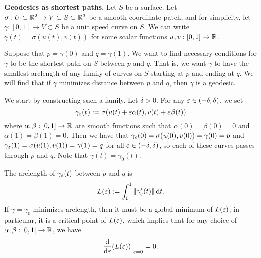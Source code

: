 {\bf Geodesics as shortest paths.} Let $S$ be a surface. 
Let $\sigma : U \subset \mathbb{R}^2 \to V \subset S \subset \mathbb{R}^3$ be a smooth 
coordinate patch, and for simplicity, let $\gamma : [0, 1] \to V \subset S$ 
be a unit speed curve on $S$. We can write $\gamma(t) = \sigma(u(t), v(t))$
for some scalar functions $u, v : [0, 1] \to \mathbb{R}$.

Suppose that $p = \gamma(0)$ and $q = \gamma(1)$. We want to find 
necessary conditions for $\gamma$ to be the shortest path on $S$ between $p$ 
and $q$. That is, we want $\gamma$ to have the smallest arclength 
of any family of curves on $S$ starting at $p$ and ending at $q$. 
We will find that if $\gamma$ minimizes distance between $p$ and 
$q$, then $\gamma$ is a geodesic. 

We start by constructing such a family. Let $\delta > 0$. For any $\varepsilon \in (-\delta, \delta)$, we set 
\[ \gamma_\varepsilon(t) := \sigma(u(t) + \varepsilon\alpha(t), v(t) + \varepsilon\beta(t)) \] 
where $\alpha, \beta : [0, 1] \to \mathbb{R}$ are smooth functions such that 
$\alpha(0) = \beta(0) = 0$ and $\alpha(1) = \beta(1) = 0$. Then we have 
that $\gamma_\varepsilon(0) = \sigma(u(0), v(0)) = \gamma(0) = p$ and 
$\gamma_\varepsilon(1) = \sigma(u(1), v(1)) = \gamma(1) = q$ for all 
$\varepsilon \in (-\delta, \delta)$, so each of these curves passes through $p$ and $q$.
Note that $\gamma(t) = \gamma_0(t)$. 

The arclength of $\gamma_\varepsilon(t)$ between $p$ and $q$ is 
\[ L(\varepsilon) := \int_0^1 \|\gamma'_\varepsilon(t)\|\,\mathrm{d} t. \] 
If $\gamma = \gamma_0$ minimizes arclength, then it must be a global 
minimum of $L(\varepsilon)$; in particular, it is a critical point of $L(\varepsilon)$, 
which implies that for any choice of 
$\alpha, \beta : [0, 1] \to \mathbb{R}$, we have 
\[ \frac{\rm d}{{\rm d}\varepsilon} (L(\varepsilon)) \Big|_{\varepsilon=0} = 0. \]

